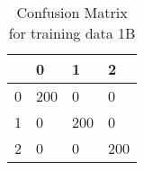 \begin{table}[H]
\centering
\begin{tabular}{|l|l|l|l|}
\hline
&0&1&2\\
\hline
0&200&0&0\\
\hline
1&0&200&0\\
\hline
2&0&0&200\\
\hline
\end{tabular}
\caption{Confusion Matrix for training data 1B}
\label{tab:conf_train1b}
\end{table}